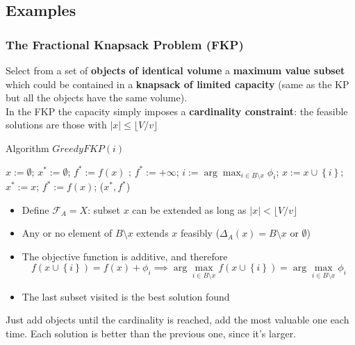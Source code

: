 \newpage

\subsection{Examples}
\subsubsection{The Fractional Knapsack Problem (FKP)}
Select from a set of \textbf{objects of identical volume} a \textbf{maximum value subset} which could be contained in a \textbf{knapsack of limited capacity} (same as the KP but all the objects have the same volume).\\

In the FKP the capacity simply imposes a \textbf{cardinality constraint}: the feasible solutions are those with $|x| \leq \lfloor V / v \rfloor$

\begin{algorithm}
	\caption{Algorithm $GreedyFKP(i)$}
	\begin{algorithmic}
		\STATE $x := \emptyset$; $x^\ast := \emptyset$;
		\STATE $f^\ast := f(x)$ ;
		\ELSE
		\STATE $f^\ast := + \infty$;
		\ENDIF
		\STATE $i:= \arg \max_{i \in B \setminus x} \phi_i$;
		\STATE $x := x \cup \left\{i\right\}$;
		\STATE $x^\ast := x$; $f^\ast := f(x)$;
		\ENDIF
		\ENDWHILE
		\RETURN ($x^\ast, f^\ast$)
	\end{algorithmic}
\end{algorithm}

\begin{itemize}
	\item Define $\mathcal{F}_A = X$: subset $x$ can be extended as long as $|x| < \lfloor V/v \rfloor$
	\item Any or no element of $B \setminus x$ extends $x$ feasibly ($\Delta_A (x) = B \setminus x$ or $\emptyset$)
	\item The objective function is additive, and therefore
	$$ f(x \cup \left\{i\right\}) = f(x) + \phi_i \implies \arg \max_{i \in B \setminus x} f(x \cup \left\{i\right\}) = \arg \max_{i \in B \setminus x} \phi_i $$
	\item The last subset visited is the best solution found
\end{itemize}
Just add objects until the cardinality is reached, add the most valuable one each time. Each solution is better than the previous one, since it's larger.\\

